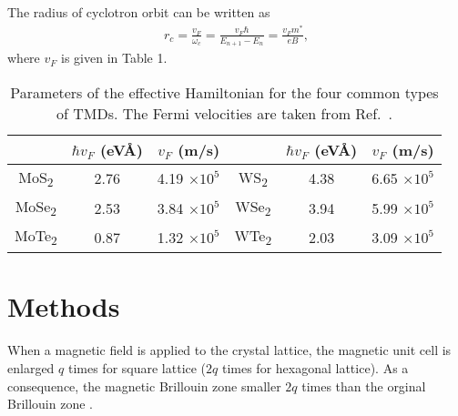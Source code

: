 \documentclass{article}
\begin{document}
The radius of cyclotron orbit can be written as
\begin{gather}
	r_{c} = \frac{v_{F}}{\omega_{c}} = \frac{v_{F} \hbar}{E_{n+1} - E_{n}} = \frac{v_{F} m^{*}}{eB},
\end{gather}
where $v_{F}$ is given in Table 1.

\begin{table}[!h]
	\centering
	\renewcommand{\arraystretch}{2.0}
	\begin{tabular}{c c c | c c c}
		\hline\hline
		                      & $\hbar v_{F}$ (eV\AA) & $v_{F}$ (m/s)        &                      & $\hbar v_{F}$ (eV\AA) & $v_{F}$ (m/s)        \\
		\hline
		MoS\textsubscript{2}  & 2.76                  & 4.19 $\times 10^{5}$ & WS\textsubscript{2}  & 4.38                  & 6.65 $\times 10^{5}$ \\ \hline
		MoSe\textsubscript{2} & 2.53                  & 3.84 $\times 10^{5}$ & WSe\textsubscript{2} & 3.94                  & 5.99 $\times 10^{5}$ \\ \hline
		MoTe\textsubscript{2} & 0.87                  & 1.32 $\times 10^{5}$ & WTe\textsubscript{2} & 2.03                  & 3.09 $\times 10^{5}$ \\
		\hline\hline
	\end{tabular}
	\caption{Parameters of the effective Hamiltonian for the four common types of TMDs. The Fermi velocities are taken from Ref.~\cite{have2019,luo2016}.}
\end{table}

\newpage

\section{Methods}

When a magnetic field is applied to the crystal lattice, the magnetic unit cell is enlarged $q$ times for square lattice ($2q$ times for hexagonal lattice). As a consequence, the magnetic Brillouin zone smaller $2q$ times than the orginal Brillouin zone \cite{xiao2010}. 
\end{document}

